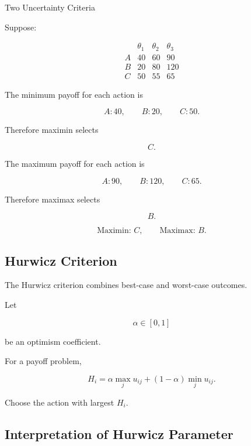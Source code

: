 \begin{workedexamplebox}{Two Uncertainty Criteria}

Suppose:

\[
\begin{array}{c|ccc}
&
\theta_1
&
\theta_2
&
\theta_3
\\
\hline
A
&
40
&
60
&
90
\\
B
&
20
&
80
&
120
\\
C
&
50
&
55
&
65
\end{array}
\]

The minimum payoff for each action is

\[
A:40,
\qquad
B:20,
\qquad
C:50.
\]

Therefore maximin selects

\[
\boxed{
C.
}
\]

The maximum payoff for each action is

\[
A:90,
\qquad
B:120,
\qquad
C:65.
\]

Therefore maximax selects

\[
\boxed{
B.
}
\]

\begin{answerbox}
\[
\boxed{
\text{Maximin: }C,
\qquad
\text{Maximax: }B.
}
\]
\end{answerbox}

\end{workedexamplebox}

\subsection{Hurwicz Criterion}
\label{subsec:hurwicz-criterion}

The Hurwicz criterion combines best-case and worst-case outcomes.

Let

\[
\alpha\in[0,1]
\]

be an optimism coefficient.

For a payoff problem,

\[
\boxed{
H_i
=
\alpha
\max_j
u_{ij}
+
(1-\alpha)
\min_j
u_{ij}.
}
\]

Choose the action with largest \(H_i\).

\subsection{Interpretation of Hurwicz Parameter}
\label{subsec:hurwicz-parameter}

